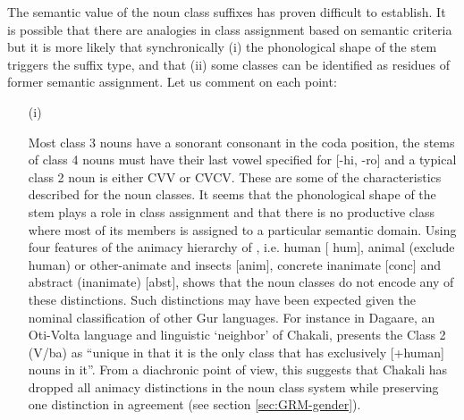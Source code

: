 The semantic value of the noun class suffixes has proven difficult to
establish. It is possible that there are analogies in class assignment based on
semantic criteria but it is more likely that synchronically (i) the phonological
shape of the stem triggers the suffix type, and that (ii) some classes can be
identified as residues of former semantic assignment. Let us comment on each
point: 


\begin{enumerate}
\item[(i)]

Most class 3 nouns have  a sonorant consonant in the coda position,
the stems of  class 4 nouns must have their last vowel specified for  [{\sc -hi,
-ro}] and a typical class 2 noun is either   CVV or CVCV.  These are some of
the characteristics  described for the noun classes. It seems that the
phonological
shape of the stem plays a role in class assignment and that there is no
productive class
where most of its  members is assigned to a particular semantic domain.  Using
four features of the animacy hierarchy
of  \cite{Comr89}, i.e.  human $[${\sc
hum}$]$, animal (exclude human) or other-animate
and insects $[${\sc anim}$]$, concrete inanimate $[${\sc conc}$]$ and abstract
(inanimate) $[${\sc abst}$]$,  \cite{Brin08} shows that the noun
classes  do not encode any of these distinctions. Such
distinctions may have
been  expected given the nominal classification of other Gur languages. For
instance in Dagaare, an Oti-Volta language and linguistic `neighbor' of
Chakali, \citet[124]{Bodo94} presents the Class 2 (V/ba) as ``unique in that it
is the only class that has exclusively [+human] nouns in it''. From a
diachronic point of view, this suggests that Chakali has dropped all animacy
distinctions in the noun class system while preserving one distinction in
agreement (see section \ref{sec:GRM-gender}).




\end{enumerate}
